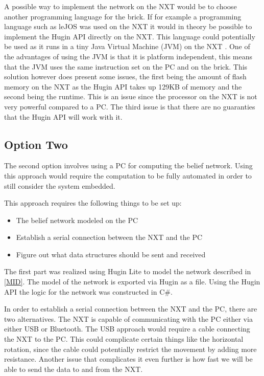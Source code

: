 A possible way to implement the network on the NXT would be to choose another
programming language for the brick. If for example a programming language such
as leJOS was used on the NXT it would in theory be possible to implement the
Hugin API directly on the NXT. This language could potentially be used as it
runs in a tiny Java Virtual Machine (JVM) on the NXT \cite{LeJos}. One of the
advantages of using the JVM is that it is platform independent, this means that
the JVM uses the same instruction set on the PC and on the brick. This solution
however does present some issues, the first being the amount of flash memory on
the NXT as the Hugin API takes up 129KB of memory and the second being the
runtime. This is an issue since the processor on the NXT is not very powerful
compared to a PC.
The third issue is that there are no guaranties that the Hugin API will work with it.


\subsection{Option Two}
The second option involves using a PC for computing the
belief network. Using this approach would require the computation to be fully
automated in order to still consider the system embedded.\nl

This approach requires the following things to be set up:
\begin{itemize}
\item The belief network modeled on the PC
\item Establish a serial connection between the NXT and the PC
\item Figure out what data structures should be sent and received
\end{itemize}

The first part was realized using Hugin Lite to model the network described
in \autoref{MID}. The model of the network is exported via Hugin as a file.
Using the Hugin API the logic for the network was constructed in C\#.\nl

In order to establish a serial connection between the NXT and the PC, there are
two alternatives. The NXT is capable of communicating with the PC either
via either USB or Bluetooth. The USB approach would require a cable connecting
the NXT to the PC.
This could complicate certain things like the horizontal rotation, since the
cable could potentially restrict the movement by adding more resistance.
Another issue that complicates it even further is how fast we will be able to
send the data to and from the NXT.\nl

